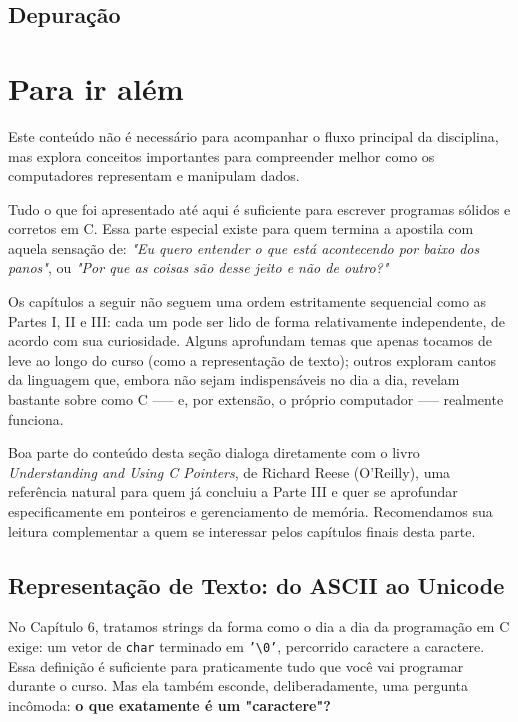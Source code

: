 \documentclass[12pt,a4paper,oneside]{extreport}
\begin{document}
\chapter{Depuração}



\part{Para ir além}

\begin{tcolorbox}[title={Para ir além}]
Este conteúdo não é necessário para acompanhar o fluxo principal
da disciplina, mas explora conceitos importantes para compreender
melhor como os computadores representam e manipulam dados.
\end{tcolorbox}

Tudo o que foi apresentado até aqui é suficiente para escrever programas sólidos e corretos em C. Essa parte especial existe para quem termina a apostila com aquela sensação de: \textit{"Eu quero entender o que está acontecendo por baixo dos panos"}, ou \textit{"Por que as coisas são desse jeito e não de outro?"}

Os capítulos a seguir não seguem uma ordem estritamente sequencial como as Partes I, II e III: cada um pode ser lido de forma relativamente independente, de acordo com sua curiosidade. Alguns aprofundam temas que apenas tocamos de leve ao longo do curso (como a representação de texto); outros exploram cantos da linguagem que, embora não sejam indispensáveis no dia a dia, revelam bastante sobre como C --— e, por extensão, o próprio computador —-- realmente funciona.

Boa parte do conteúdo desta seção dialoga diretamente com o livro \textit{Understanding and Using C Pointers}, de Richard Reese (O'Reilly), uma referência natural para quem já concluiu a Parte III e quer se aprofundar especificamente em ponteiros e gerenciamento de memória. Recomendamos sua leitura complementar a quem se interessar pelos capítulos finais desta parte.

\chapter*{Representação de Texto: do ASCII ao Unicode}

No Capítulo 6, tratamos strings da forma como o dia a dia da programação em C exige: um vetor de \texttt{char} terminado em \texttt{'\textbackslash 0'}, percorrido caractere a caractere. Essa definição é suficiente para praticamente tudo que você vai programar durante o curso. Mas ela também esconde, deliberadamente, uma pergunta incômoda: \textbf{o que exatamente é um "caractere"?}
\end{document}
